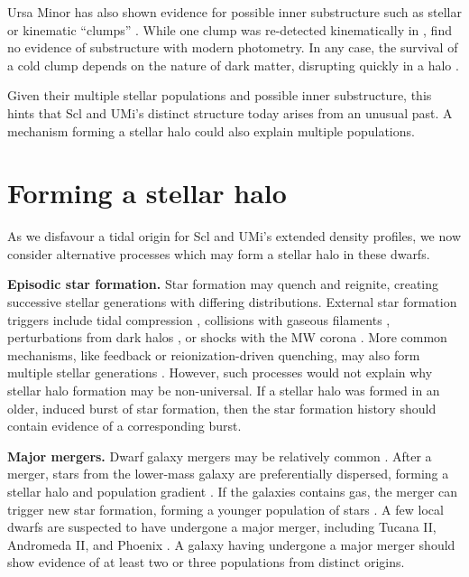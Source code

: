 Ursa Minor has also shown evidence for possible inner substructure such
as stellar or kinematic ``clumps''
\citep[e.g.,][]{olszewski+aaronson1985, demers+1995, kleyna+1998, battinelli+demers1999, bellazzini+2002}.
While one clump was re-detected kinematically in \citet{pace+2014},
\citet{munoz+2018} find no evidence of substructure with modern
photometry. In any case, the survival of a cold clump depends on the
nature of dark matter, disrupting quickly in a \LCDM{} halo
\citep{kleyna+2003, lora+2012}.

Given their multiple stellar populations and possible inner
substructure, this hints that Scl and UMi's distinct structure today
arises from an unusual past. A mechanism forming a stellar halo could
also explain multiple populations.

\section{Forming a stellar halo}\label{sec:stellar_halos}

As we disfavour a tidal origin for Scl and UMi's extended density
profiles, we now consider alternative processes which may form a stellar
halo in these dwarfs.

\textbf{Episodic star formation.} Star formation may quench and
reignite, creating successive stellar generations with differing
distributions. External star formation triggers include tidal
compression \citep{mayer+2001a, dong+lin+murray2003}, collisions with
gaseous filaments \citep{genina+2019}, perturbations from dark halos
\citep{starkenburg+helmi+sales2016}, or shocks with the MW corona
\citep{wright+2019}. More common mechanisms, like feedback or
reionization-driven quenching, may also form multiple stellar
generations
\citep{kawata+2006, benitez-llambay+2015, revaz+jablonka2018}. However,
such processes would not explain why stellar halo formation may be
non-universal. If a stellar halo was formed in an older, induced burst
of star formation, then the star formation history should contain
evidence of a corresponding burst.

\textbf{Major mergers.} Dwarf galaxy mergers may be relatively common
\citep{deason+wetzel+garrison-kimmel2014}. After a merger, stars from
the lower-mass galaxy are preferentially dispersed, forming a stellar
halo and population gradient \citep{benitez-llambay+2016, deason+2022}.
If the galaxies contains gas, the merger can trigger new star formation,
forming a younger population of stars \citep[e.g.,][]{genina+2019}. A
few local dwarfs are suspected to have undergone a major merger,
including Tucana II, Andromeda II, and Phoenix
\citep{lokas+2014, fouquet+2017, tarumi+2021, cardona-barrero+2021, querci+2025}.
A galaxy having undergone a major merger should show evidence of at
least two or three populations from distinct origins.

